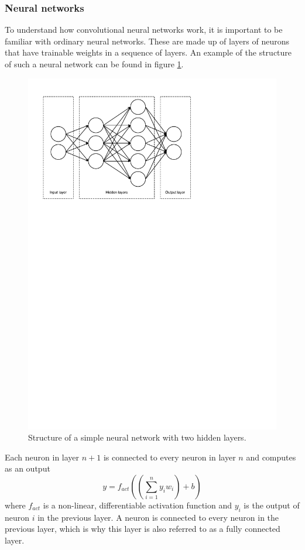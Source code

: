 \documentclass[12pt,a4paper,twoside,openright]{report}
\begin{document}
\subsubsection{Neural networks}
To understand how convolutional neural networks work, it is important to be familiar with ordinary neural networks. These are made up of layers of neurons that have trainable weights in a sequence of layers. An example of the structure of such a neural network can be found in figure \ref{fig:nn_layout}.
\begin{figure}
	\centering
	\includegraphics[scale=0.6]{nn_layout}
	\caption{Structure of a simple neural network with two hidden layers.}
	\label{fig:nn_layout}
\end{figure}

Each neuron in layer $n+1$ is connected to every neuron in layer $n$ and computes as an output
\[y = f_{act}((\sum_{i=1}^{n} y_i w_i) + b)\]
where $f_{act}$ is a non-linear, differentiable activation function and $y_i$ is the output of neuron $i$ in the previous layer. A neuron is connected to every neuron in the previous layer, which is why this layer is also referred to as a fully connected layer.
\end{document}
